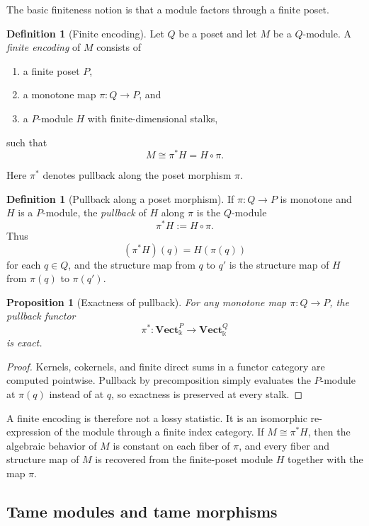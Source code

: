 \documentclass[11pt]{article}
\newcommand{\kk}{\Bbbk}
\newtheorem{proposition}[theorem]{Proposition}
\theoremstyle{definition}
\newtheorem{defn}[theorem]{Definition}
\theoremstyle{remark}
\begin{document}
The basic finiteness notion is that a module factors through a finite poset.

\begin{defn}[Finite encoding]
Let $Q$ be a poset and let $M$ be a $Q$-module. A \emph{finite encoding} of $M$ consists of
\begin{enumerate}[label=(\roman*)]
    \item a finite poset $P$,
    \item a monotone map $\pi : Q \to P$, and
    \item a $P$-module $H$ with finite-dimensional stalks,
\end{enumerate}
such that
\[
M \cong \pi^* H = H \circ \pi.
\]
\end{defn}

Here $\pi^*$ denotes pullback along the poset morphism $\pi$.

\begin{defn}[Pullback along a poset morphism]
If $\pi : Q \to P$ is monotone and $H$ is a $P$-module, the \emph{pullback} of $H$ along $\pi$ is the $Q$-module
\[
\pi^*H := H \circ \pi.
\]
Thus
\[
(\pi^*H)(q)=H(\pi(q))
\]
for each $q \in Q$, and the structure map from $q$ to $q'$ is the structure map of $H$ from $\pi(q)$ to $\pi(q')$.
\end{defn}

\begin{proposition}[Exactness of pullback]
For any monotone map $\pi : Q \to P$, the pullback functor
\[
\pi^* : \mathbf{Vect}_{\kk}^{P} \longrightarrow \mathbf{Vect}_{\kk}^{Q}
\]
is exact.
\end{proposition}

\begin{proof}
Kernels, cokernels, and finite direct sums in a functor category are computed pointwise. Pullback by precomposition simply evaluates the $P$-module at $\pi(q)$ instead of at $q$, so exactness is preserved at every stalk.
\end{proof}

A finite encoding is therefore not a lossy statistic. It is an isomorphic re-expression of the module through a finite index category. If $M \cong \pi^*H$, then the algebraic behavior of $M$ is constant on each fiber of $\pi$, and every fiber and structure map of $M$ is recovered from the finite-poset module $H$ together with the map $\pi$.

\subsection{Tame modules and tame morphisms}
\end{document}
